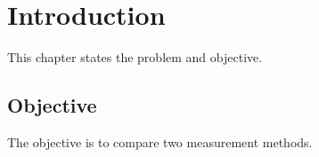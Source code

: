 \chapter{Introduction}
\label{chap:introduction}

This chapter states the problem and objective.

\section{Objective}
The objective is to compare two measurement methods.
